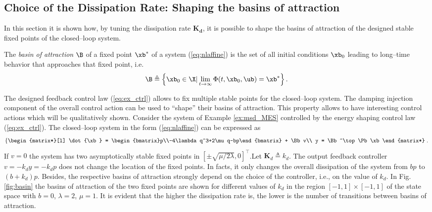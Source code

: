 \subsection{Choice of the Dissipation Rate: Shaping the basins of attraction}
%
In this section it is shown how, by tuning the dissipation rate $\mathbf{K_d}$, it is possible to shape the basins of attraction of the designed stable fixed points of the closed--loop system.
%
\begin{defn}
The \textit{basin of attraction} $\B$ of a fixed point $\xb^*$ of a system (\ref{eq:nlaffine}) is the set of all initial conditions $\xb_0$ leading to long--time behavior that approaches that fixed point, i.e.
%
\begin{equation*}
    \B \triangleq \left\{\xb_0\in\X|\lim \limits_{t\rightarrow\infty}\Phi(t,\xb_0,\ub)=\xb^*\right\}.
\end{equation*}
%
\end{defn}
%
The designed feedback control law (\ref{eq:ex_ctrl}) allows to fix multiple stable points for the closed--loop system. The damping injection component of the overall control action can be used to ``shape'' their basins of attraction. This property allows to have interesting control actions which will be qualitatively shown.
%
Consider the system of Example \ref{ex:msd_MES} controlled by the energy shaping control law (\ref{eq:ex_ctrl}). The closed--loop system in the form (\ref{eq:nlaffine}) can be expressed as
%
\begin{equation*}
	\left\{
    \begin{matrix*}[l]
    \dot{\xb} = \begin{bmatrix}p\\-4\lambda q^3+2\mu q-bp\end{bmatrix} + \Bb v\\
    y = \Bb^\top \Pb\xb
    \end{matrix*}
    \right. .
\end{equation*}
%
If $v= 0$ the system has two asymptotically stable fixed points in $[\pm\sqrt{\mu/2\lambda},0]^\top$.Let $\mathbf{K}_d \triangleq k_d$. The output feedback controller $v = -k_d y = -k_dp$ does not change the location of the fixed points. In facts, it only changes the overall dissipation of the system from $bp$ to $(b+k_d)p$.
%
Besides, the respective basins of attraction strongly depend on the choice of the controller, i.e., on the value of $k_d$. In Fig. \ref{fig:basin} the basins of attraction of the two fixed points are shown for different values of $k_d$ in the region $[-1,1]\times [-1,1]$ of the state space with $b = 0$, $\lambda = 2$, $\mu = 1$. It is evident that the higher the dissipation rate is, the lower is the number of transitions between basins of attraction.
